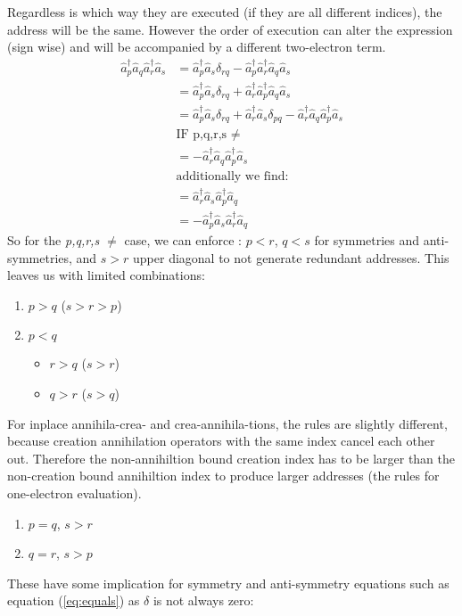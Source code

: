 \documentclass[12p]{article}
\begin{document}
Regardless is which way they are executed (if they are all different indices), the address will be the same. However the order of execution can alter the expression (sign wise) and will be accompanied by a different two-electron term.
\begin{align}
  \hat{a}^\dagger_p \hat{a}_q \hat{a}^\dagger_r \hat{a}_s & = \hat{a}^\dagger_p \hat{a}_s \delta_{rq} - \hat{a}^\dagger_p \hat{a}^\dagger_r \hat{a}_q \hat{a}_s \nonumber \\
  & = \hat{a}^\dagger_p  \hat{a}_s \delta_{rq} + \hat{a}^\dagger_r \hat{a}^\dagger_p \hat{a}_q \hat{a}_s \nonumber \\
  & = \hat{a}^\dagger_p  \hat{a}_s \delta_{rq} + \hat{a}^\dagger_r \hat{a}_s \delta_{pq} - \hat{a}^\dagger_r \hat{a}_q \hat{a}^\dagger_p \hat{a}_s \label{eq:equals} \\
  & \text{IF p,q,r,s $\neq$} \nonumber \\
  & = -\hat{a}^\dagger_r \hat{a}_q \hat{a}^\dagger_p \hat{a}_s \\
  & \text{additionally we find:} \nonumber \\
  & = \hat{a}^\dagger_r \hat{a}_s \hat{a}^\dagger_p \hat{a}_q \\
  & = -\hat{a}^\dagger_p \hat{a}_s \hat{a}^\dagger_r \hat{a}_q
\end{align}
So for the \textit{p,q,r,s $\neq$} case, we can enforce : $p<r$, $q<s$ for symmetries and anti-symmetries, and $s > r$ upper diagonal to not generate redundant addresses. This leaves us with limited combinations:

\begin{enumerate}
  \item $p > q$ ($s > r > p$)
  \item $p < q$
  \begin{itemize}
    \item $r > q$ ($s > r$)
    \item $q > r$ ($s > q$)
  \end{itemize}
\end{enumerate}
For inplace annihila-crea- and crea-annihila-tions, the rules are slightly different, because creation annihilation operators with the same index cancel each other out. Therefore the non-annihiltion bound creation index has to be larger than the non-creation bound annihiltion index to produce larger addresses (the rules for one-electron evaluation).

\begin{enumerate}
  \item $p = q$, $s > r$
  \item $q = r$, $s > p$
\end{enumerate}
These have some implication for symmetry and anti-symmetry equations such as equation (\ref{eq:equals}) as $\delta$ is not always zero:
\end{document}
